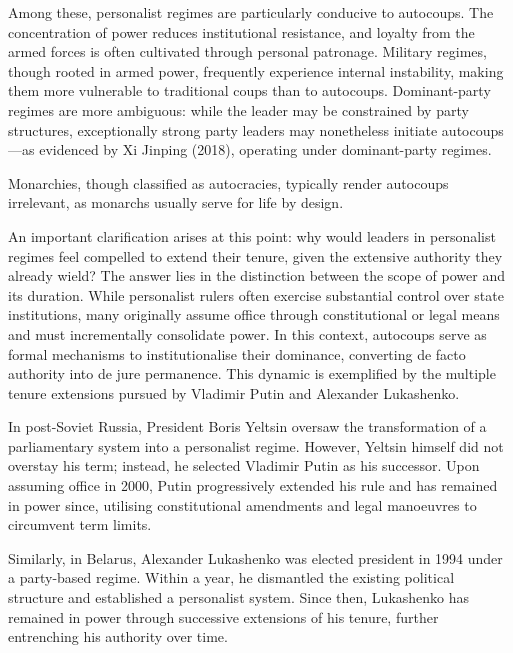 \documentclass[
  12pt,
]{report}
\begin{document}
Among these, personalist regimes are particularly conducive to
autocoups. The concentration of power reduces institutional resistance,
and loyalty from the armed forces is often cultivated through personal
patronage. Military regimes, though rooted in armed power, frequently
experience internal instability, making them more vulnerable to
traditional coups than to autocoups. Dominant-party regimes are more
ambiguous: while the leader may be constrained by party structures,
exceptionally strong party leaders may nonetheless initiate
autocoups---as evidenced by Xi Jinping (2018), operating under
dominant-party regimes.

Monarchies, though classified as autocracies, typically render autocoups
irrelevant, as monarchs usually serve for life by design.

An important clarification arises at this point: why would leaders in
personalist regimes feel compelled to extend their tenure, given the
extensive authority they already wield? The answer lies in the
distinction between the scope of power and its duration. While
personalist rulers often exercise substantial control over state
institutions, many originally assume office through constitutional or
legal means and must incrementally consolidate power. In this context,
autocoups serve as formal mechanisms to institutionalise their
dominance, converting de facto authority into de jure permanence. This
dynamic is exemplified by the multiple tenure extensions pursued by
Vladimir Putin and Alexander Lukashenko.

In post-Soviet Russia, President Boris Yeltsin oversaw the
transformation of a parliamentary system into a personalist regime.
However, Yeltsin himself did not overstay his term; instead, he selected
Vladimir Putin as his successor. Upon assuming office in 2000, Putin
progressively extended his rule and has remained in power since,
utilising constitutional amendments and legal manoeuvres to circumvent
term limits.

Similarly, in Belarus, Alexander Lukashenko was elected president in
1994 under a party-based regime. Within a year, he dismantled the
existing political structure and established a personalist system. Since
then, Lukashenko has remained in power through successive extensions of
his tenure, further entrenching his authority over time.
\end{document}
